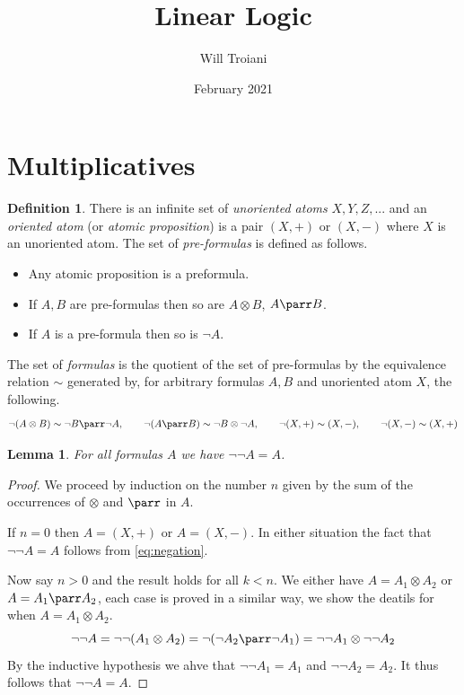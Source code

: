 \documentclass[12pt]{article}
\title{Linear Logic}
\author{Will Troiani}
\date{February 2021}
\theoremstyle{plain}
\newtheorem{lemma}[thm]{Lemma}
\theoremstyle{definition}
\newtheorem{defn}[thm]{Definition} %
\begin{document}
	\maketitle
	\tableofcontents
	\section{Multiplicatives}
	\begin{defn}\label{def:formulas}
		There is an infinite set of \emph{unoriented atoms} $X,Y,Z,...$ and an \emph{oriented atom} (or \emph{atomic proposition}) is a pair $(X,+)$ or $(X,-)$ where $X$ is an unoriented atom. The set of \emph{pre-formulas} is defined as follows.
		\begin{itemize}
			\item Any atomic proposition is a preformula.
			\item If $A,B$ are pre-formulas then so are $A \otimes B$, $A \parr B$.
			\item If $A$ is a pre-formula then so is $\neg A$.
		\end{itemize}
		The set of \emph{formulas} is the quotient of the set of pre-formulas by the equivalence relation $\sim$ generated by, for arbitrary formulas $A,B$ and unoriented atom $X$, the following.
		\begin{equation}\label{eq:negation}
			\neg (A \otimes B) \sim \neg B \parr \neg A,\qquad \neg (A \parr B) \sim \neg B \otimes \neg A,\qquad \neg (X, +) \sim (X, -),\qquad \neg (X,-) \sim (X,+)
		\end{equation}
	\end{defn}
	\begin{lemma}
		For all formulas $A$ we have $\neg \neg A = A$.
	\end{lemma}
	\begin{proof}
		We proceed by induction on the number $n$ given by the sum of the occurrences of $\otimes$ and $\parr$ in $A$.
		
		If $n = 0$ then $A = (X,+)$ or $A = (X,-)$. In either situation the fact that $\neg \neg A = A$ follows from \eqref{eq:negation}.
		
		Now say $n > 0$ and the result holds for all $k < n$. We either have $A = A_1 \otimes A_2$ or $A = A_1 \parr A_2$, each case is proved in a similar way, we show the deatils for when $A = A_1 \otimes A_2$.
		\begin{equation}
			\neg \neg A = \neg \neg (A_1 \otimes A_2) = \neg (\neg A_2 \parr \neg A_1) = \neg \neg A_1 \otimes \neg \neg A_2
		\end{equation}
		By the inductive hypothesis we ahve that $\neg \neg A_1 = A_1$ and $\neg \neg A_2 = A_2$. It thus follows that $\neg \neg A = A$.
	\end{proof}
\end{document}
